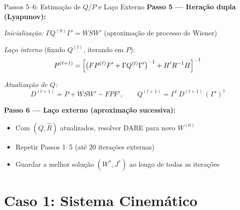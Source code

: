 \documentclass[aspectratio=169]{beamer}
\begin{document}
\begin{frame}{Passos 5--6: Estimação de $Q$/$P$ e Laço Externo}
    \textbf{Passo 5 — Iteração dupla (Lyapunov):}

    \smallskip
    \textit{Inicialização:} $\Gamma Q^{(0)}\Gamma' = WSW'$
    (aproximação de processo de Wiener)

    \textit{Laço interno} (fixado $Q^{(t)}$, iterando em $P$):
    \[
        P^{(\ell+1)} = \Bigl[\bigl(FP^{(\ell)}F' + \Gamma Q^{(t)}\Gamma'\bigr)^{-1}
                        + H'R^{-1}H\Bigr]^{-1}
    \]

    \textit{Atualização de $Q$:}
    \[
        D^{(t+1)} = P + WSW' - FPF', \qquad
        Q^{(t+1)} = \Gamma^{\dagger}\,D^{(t+1)}\,(\Gamma')^{\dagger}
    \]

    \vspace{0.1cm}
    \textbf{Passo 6 — Laço externo (aproximação sucessiva):}
    \begin{itemize}
        \item Com $(\hat{Q},\hat{R})$ atualizados, resolver DARE para novo $W^{(0)}$
        \item Repetir Passos 1--5 (até 20 iterações externas)
        \item Guardar a melhor solução $(W^*, J^*)$ ao longo de todas as iterações
    \end{itemize}
\end{frame}

\section{Caso 1: Sistema Cinemático}
\end{document}
